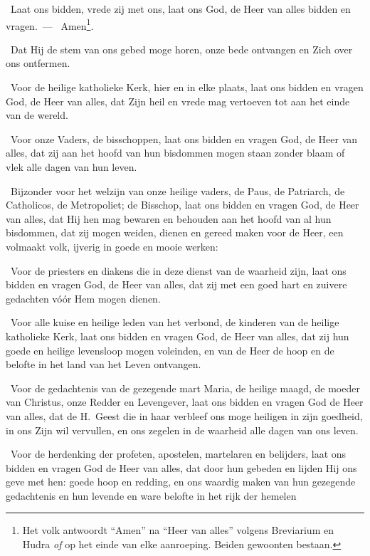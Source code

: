 \documentclass[12pt,twoside,a5paper]{article}
\begin{document}
\begin{halfparskip}
  \liturgicalLbracket\dd~Laat ons bidden, vrede zij met ons, laat ons God, de Heer van alles bidden en vragen.~--- \rr~Amen\footnote{Het volk antwoordt ``Amen'' na ``Heer van alles'' volgens Breviarium en Hudra \emph{of} op het einde van elke aanroeping. Beiden gewoonten bestaan.}.

  \dd~Dat Hij de stem van ons gebed moge horen, onze bede ontvangen en Zich over ons ontfermen.

  \dd~Voor de heilige katholieke Kerk, hier en in elke plaats, laat ons bidden en vragen God, de Heer van alles, dat Zijn heil en vrede mag vertoeven tot aan het einde van de wereld.

  \dd~Voor onze Vaders, de bisschoppen, laat ons bidden en vragen God, de Heer van alles, dat zij aan het hoofd van hun bisdommen mogen staan zonder blaam of vlek alle dagen van hun leven.

  \dd~Bijzonder voor het welzijn van onze heilige vaders, de Paus, de Patriarch, de Catholicos, de Metropoliet; de Bisschop, laat ons bidden en vragen God, de Heer van alles, dat Hij hen mag bewaren en behouden aan het hoofd van al hun bisdommen, dat zij mogen weiden, dienen en gereed maken voor de Heer, een volmaakt volk, ijverig in goede en mooie werken:

  \dd~Voor de priesters en diakens die in deze dienst van de waarheid zijn, laat ons bidden en vragen God, de Heer van alles, dat zij met een goed hart en zuivere gedachten vóór Hem mogen dienen.

  \dd~Voor alle kuise en heilige leden van het verbond, de kinderen van de heilige katholieke Kerk, laat ons bidden en vragen God, de Heer van alles, dat zij hun goede en heilige levensloop mogen voleinden, en van de Heer de hoop en de belofte in het land van het Leven ontvangen.

  \dd~Voor de gedachtenis van de gezegende mart Maria, de heilige maagd, de moeder van Christus, onze Redder en Levengever, laat ons bidden en vragen God de Heer van alles, dat de H.~Geest die in haar verbleef ons moge heiligen in zijn goedheid, in ons Zijn wil vervullen, en ons zegelen in de waarheid alle dagen van ons leven.

  \dd~Voor de herdenking der profeten, apostelen, martelaren en belijders, laat ons bidden en vragen God de Heer van alles, dat door hun gebeden en lijden Hij ons geve met hen: goede hoop en redding, en ons waardig maken van hun gezegende gedachtenis en hun levende en ware belofte in het rijk der hemelen


\end{halfparskip}
\end{document}
